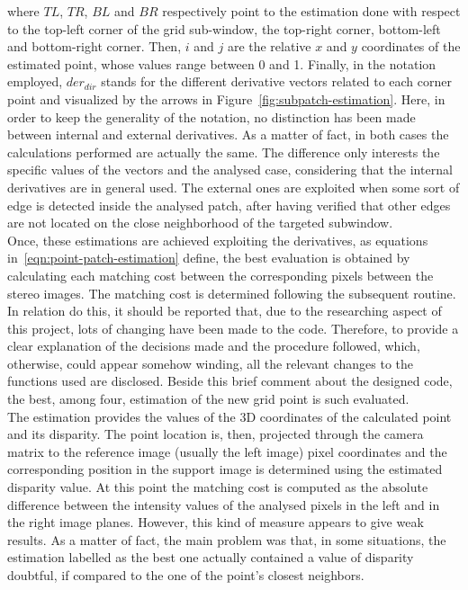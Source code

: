 where $TL$, $TR$, $BL$ and $BR$ respectively point to the estimation done with respect to the top-left corner of the grid sub-window, the top-right corner, bottom-left and bottom-right corner. 
Then, $i$ and $j$ are the relative $x$ and $y$ coordinates of the estimated point, whose values range between 0 and 1.
Finally, in the notation employed, $der_{dir}$ stands for the different derivative vectors related to each corner point and visualized by the arrows in Figure~\ref{fig:subpatch-estimation}.
Here, in order to keep the generality of the notation, no distinction has been made between internal and external derivatives.
As a matter of fact, in both cases the calculations performed are actually the same.
The difference only interests the specific values of the vectors and the analysed case, considering that the internal derivatives are in general used.
The external ones are exploited when some sort of edge is detected inside the analysed patch, after having verified that other edges are not located on the close neighborhood of the targeted subwindow. \\
Once, these estimations are achieved exploiting the derivatives, as equations in~\ref{eqn:point-patch-estimation} define, the best evaluation is obtained by calculating each matching cost between the corresponding pixels between the stereo images. 
The matching cost is determined following the subsequent routine.\\
In relation do this, it should be reported that, due to the researching aspect of this project, lots of changing have been made to the code.
Therefore, to provide a clear explanation of the decisions made and the procedure followed, which, otherwise, could appear somehow winding, all the relevant changes to the functions used are disclosed. 
Beside this brief comment about the designed code, the best, among four, estimation of the new grid point is such evaluated.\\
The estimation provides the values of the 3D coordinates of the calculated point and its disparity.
The point location is, then, projected through the camera matrix to the reference image (usually the left image) pixel coordinates and the corresponding position in the support image is determined using the estimated disparity value. 
At this point the matching cost is computed as the absolute difference between the intensity values of the analysed pixels in the left and in the right image planes. 
However, this kind of measure appears to give weak results. 
As a matter of fact, the main problem was that, in some situations, the estimation labelled as the best one actually contained a value of disparity doubtful, if compared to the one of the point's closest neighbors.  
